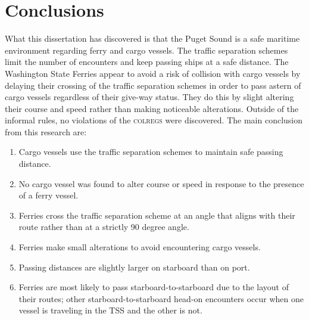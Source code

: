 \documentclass[twoside,symmetric,notoc]{tufte-book}
\begin{document}
\section{Conclusions}
\par{%
What this dissertation has discovered is that the Puget Sound is a safe maritime environment regarding ferry and cargo vessels. The traffic separation schemes limit the number of encounters and keep passing ships at a safe distance. The Washington State Ferries appear to avoid a risk of collision with cargo vessels by delaying their crossing of the traffic separation schemes in order to pass astern of cargo vessels regardless of their give-way status. They do this by slight altering their course and speed rather than making noticeable alterations. Outside of the informal rules, no violations of the \textsc{colregs} were discovered. The main conclusion from this research are:
\begin{enumerate}
        \item Cargo vessels use the traffic separation schemes to maintain safe passing distance.
        \item No cargo vessel was found to alter course or speed in response to the presence of a ferry vessel.
        \item Ferries cross the traffic separation scheme at an angle that aligns with their route rather than at a strictly 90 degree angle.
        \item Ferries make small alterations to avoid encountering cargo vessels.
        \item Passing distances are slightly larger on starboard than on port.
        \item Ferries are most likely to pass starboard-to-starboard due to the layout of their routes; other starboard-to-starboard head-on encounters occur when one vessel is traveling in the TSS and the other is not.
\end{enumerate}
}
\par{%
}


\end{document}
